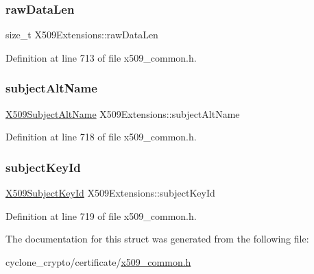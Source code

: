 \subsubsection{\texorpdfstring{raw\+Data\+Len}{rawDataLen}}
{\footnotesize\ttfamily size\+\_\+t X509\+Extensions\+::raw\+Data\+Len}



Definition at line 713 of file x509\+\_\+common.\+h.

\mbox{\label{structX509Extensions_a6a01ce6bc43517af604b8cf580ebd01d}} 
\subsubsection{\texorpdfstring{subject\+Alt\+Name}{subjectAltName}}
{\footnotesize\ttfamily \hyperlink{structX509SubjectAltName}{X509\+Subject\+Alt\+Name} X509\+Extensions\+::subject\+Alt\+Name}



Definition at line 718 of file x509\+\_\+common.\+h.

\mbox{\label{structX509Extensions_a720e6ecde7eba80ee36a83d18a67dfd9}} 
\subsubsection{\texorpdfstring{subject\+Key\+Id}{subjectKeyId}}
{\footnotesize\ttfamily \hyperlink{structX509SubjectKeyId}{X509\+Subject\+Key\+Id} X509\+Extensions\+::subject\+Key\+Id}



Definition at line 719 of file x509\+\_\+common.\+h.



The documentation for this struct was generated from the following file\+:\begin{DoxyCompactItemize}
\item 
cyclone\+\_\+crypto/certificate/\hyperlink{certificate_2x509__common_8h}{x509\+\_\+common.\+h}\end{DoxyCompactItemize}
